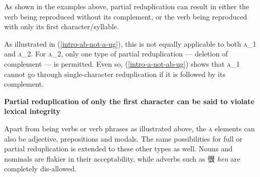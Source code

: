 \documentclass[12pt, UTF8]{article}
\begin{document}
As shown in the examples above, partial reduplication can result in either the verb being reproduced without its complement, or the verb being reproduced with only its first character/syllable. 

As illustrated in (\ref{intro-ab-not-a-ug}), this is not equally applicable to both \textsc{a_1} and \textsc{a_2}. For \textsc{a_2}, only one type of partial reduplication --- deletion of complement --- is permitted. Even so, (\ref{intro-a-not-ab-ug}) shows that \textsc{a_1} cannot go through single-character reduplication if it is followed by its complement.\footnotemark[2] 


\textbf{Partial reduplication of only the first character can be said to violate lexical integrity}

Apart from being verbs or verb phrases as illustrated above, the \textsc{a} elements can also be adjective, prepositions and modals. The same possibilities for full or partial reduplication is extended to these other types as well. Nouns and nominals are flakier in their acceptability, while adverbs such as 很 \textit{hen} are completely dis-allowed.
\end{document}
